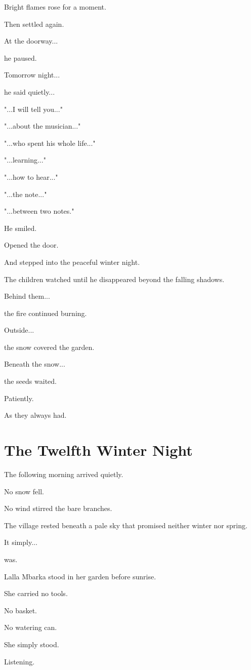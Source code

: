 \documentclass[12pt,openany]{book}
\begin{document}
Bright flames rose for a moment.

Then settled again.

At the doorway...

he paused.

Tomorrow night...

he said quietly...

"...I will tell you..."

"...about the musician..."

"...who spent his whole life..."

"...learning..."

"...how to hear..."

"...the note..."

"...between two notes."

He smiled.

Opened the door.

And stepped into the peaceful winter night.

The children watched until he disappeared beyond the falling shadows.

Behind them...

the fire continued burning.

Outside...

the snow covered the garden.

Beneath the snow...

the seeds waited.

Patiently.

As they always had.
\chapter{The Twelfth Winter Night}

The following morning arrived quietly.

No snow fell.

No wind stirred the bare branches.

The village rested beneath a pale sky that promised neither winter nor spring.

It simply...

was.

Lalla Mbarka stood in her garden before sunrise.

She carried no tools.

No basket.

No watering can.

She simply stood.

Listening.
\end{document}
